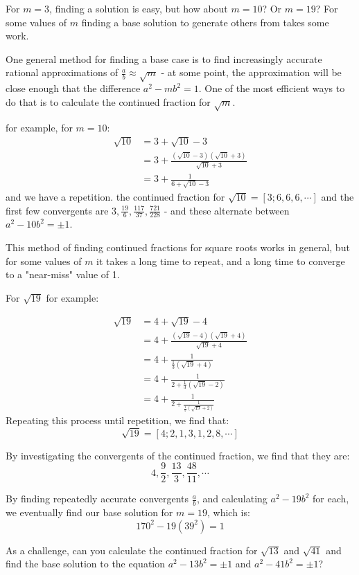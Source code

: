\documentclass{article}
\begin{document}
For $m=3$, finding a solution is easy, but how about $m=10$? Or $m=19$? For some values of $m$ finding a base solution to generate others from takes some work.

One general method for finding a base case is to find increasingly accurate rational approximations of $\frac{a}{b} \approx \sqrt{m}$ - at some point, the approximation will be close enough that the difference $ a^2-mb^2 = 1$. One of the most efficient ways to do that is to calculate the continued fraction for $\sqrt{m}$.

for example, for $m=10$:
\begin{align*}
    \sqrt{10} &= 3+\sqrt{10}-3 \\
    &= 3+\frac{(\sqrt{10}-3)(\sqrt{10}+3)}{\sqrt{10}+3} \\
    &= 3 + \frac{1}{6+\sqrt{10}-3}
\end{align*}
and we have a repetition. the continued fraction for $\sqrt{10} = [3;6,6,6,\cdots]$ and the first few convergents are $3,\frac{19}{6},\frac{117}{37}, \frac{721}{228}$ - and these alternate between $a^2-10b^2=\pm1$.

This method of finding continued fractions for square roots works in general, but for some values of $m$ it takes a long time to repeat, and a long time to converge to a "near-miss" value of 1.

For $\sqrt{19}$ for example:

\begin{align*}
    \sqrt{19} &= 4 + \sqrt{19} -4 \\
    &= 4 + \frac{(\sqrt{19}-4)(\sqrt{19}+4)}{\sqrt{19}+4} \\
    &= 4 + \frac{1}{\frac{1}{3}(\sqrt{19}+4)} \\
    &= 4 + \frac{1}{2 + \frac{1}{3}(\sqrt{19} - 2) } \\
    &= 4 + \frac{1}{2 + \frac{1}{\frac{1}{5}(\sqrt{19} + 2)}}
\end{align*}
Repeating this process until repetition, we find that:
\[ \sqrt{19} = [4;2,1,3,1,2,8,\cdots] \]

By investigating the convergents of the continued fraction, we find that they are:
\[ 4,\frac{9}{2},\frac{13}{3}, \frac{48}{11}, \cdots \]

By finding repeatedly accurate convergents $\frac{a}{b}$, and calculating $a^2-19b^2$ for each, 
we eventually find our base solution for $m=19$, which is:
\[ 170^2 - 19(39^2)  = 1 \]

As a challenge, can you calculate the continued fraction for $\sqrt{13}$ and $\sqrt{41}$ and
find the base solution to the equation $a^2-13b^2 = \pm 1$ and $a^2 - 41b^2 = \pm1$?
\end{document}
